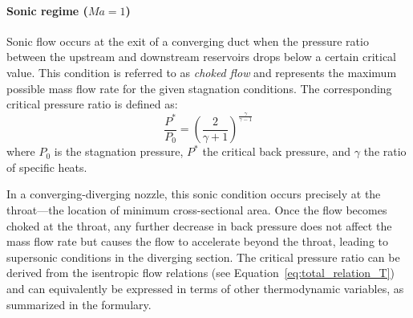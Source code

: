 	\paragraph{Sonic regime ($Ma = 1$)}
		Sonic flow occurs at the exit of a converging duct when the pressure ratio between the upstream and downstream reservoirs drops below a certain critical value. 
		This condition is referred to as \emph{choked flow} and represents the maximum possible mass flow rate for the given stagnation conditions. 
		The corresponding critical pressure ratio is defined as:
		\begin{equation}
			\frac{P^*}{P_0}=\left(\frac{2}{\gamma + 1}\right)^{\frac{\gamma}{\gamma - 1}}
			\label{eq:critical-pressure}
		\end{equation}
		where $P_0$ is the stagnation pressure, $P^*$ the critical back pressure, and $\gamma$ the ratio of specific heats.

		In a converging-diverging nozzle, this sonic condition occurs precisely at the throat—the location of minimum cross-sectional area. 
		Once the flow becomes choked at the throat, any further decrease in back pressure does not affect the mass flow rate but causes the flow to accelerate beyond the throat, leading to supersonic conditions in the diverging section. 
		The critical pressure ratio can be derived from the isentropic flow relations (see Equation~\eqref{eq:total_relation_T}) and can equivalently be expressed in terms of other thermodynamic variables, as summarized in the formulary.

